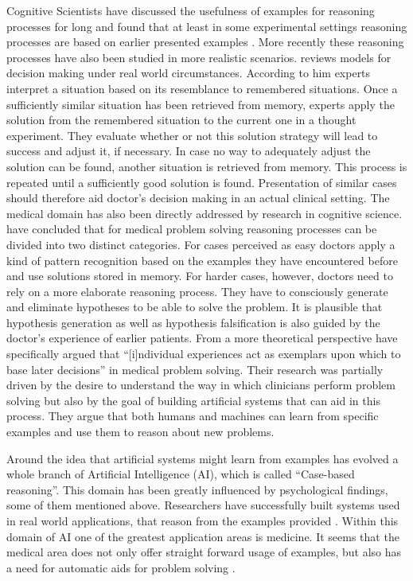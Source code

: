 Cognitive Scientists have discussed the usefulness of examples for reasoning processes for long and found that at least in some experimental settings reasoning processes are based on earlier presented examples \citep{Medin1978}. More recently these reasoning processes have also been studied in more realistic scenarios. \citet{Klein2008} reviews models for decision making under real world circumstances. According to him experts interpret a situation based on its resemblance to remembered situations. Once a sufficiently similar situation has been retrieved from memory, experts apply the solution from the remembered situation to the current one in a thought experiment. They evaluate whether or not this solution strategy will lead to success and adjust it, if necessary. In case no way to adequately adjust the solution can be found, another situation is retrieved from memory. This process is repeated until a sufficiently good solution is found. Presentation of similar cases should therefore aid doctor's decision making in an actual clinical setting. The medical domain has also been directly addressed by research in cognitive science. \citet{Elstein2002} have concluded that for medical problem solving reasoning processes can be divided into two distinct categories. For cases perceived as easy doctors apply a kind of pattern recognition based on the examples they have encountered before and use solutions stored in memory. For harder cases, however, doctors need to rely on a more elaborate reasoning process. They have to consciously generate and eliminate hypotheses to be able to solve the problem. It is plausible that hypothesis generation as well as hypothesis falsification is also guided by the doctor's experience of earlier patients. From a more theoretical perspective \citet{Kolodner1987} have specifically argued that ``[i]ndividual experiences act as exemplars upon which to base later decisions'' in medical problem solving. Their research was partially driven by the desire to understand the way in which clinicians perform problem solving but also by the goal of building artificial systems that can aid in this process. They argue that both humans and machines can learn from specific examples and use them to reason about new problems.

Around the idea that artificial systems might learn from examples has evolved a whole branch of Artificial Intelligence (AI), which is called ``Case-based reasoning''. This domain has been greatly influenced by psychological findings, some of them mentioned above. Researchers have successfully built systems used in real world applications, that reason from the examples provided  \citep{Aamodt1994}. Within this domain of AI one of the greatest application areas is medicine. It seems that the medical area does not only offer straight forward usage of examples, but also has a need for automatic aids for problem solving \citep{Begum2011}.

